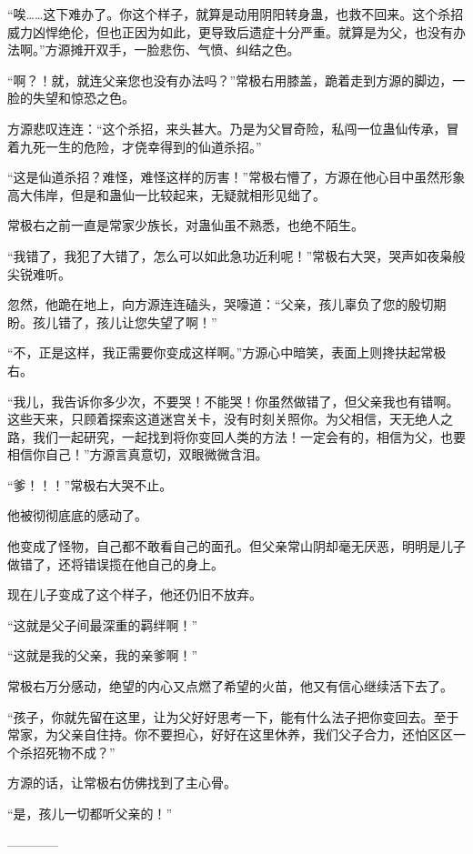 \begin{this_body}
“唉……这下难办了。你这个样子，就算是动用阴阳转身蛊，也救不回来。这个杀招威力凶悍绝伦，但也正因为如此，更导致后遗症十分严重。就算是为父，也没有办法啊。”方源摊开双手，一脸悲伤、气愤、纠结之色。

“啊？！就，就连父亲您也没有办法吗？”常极右用膝盖，跪着走到方源的脚边，一脸的失望和惊恐之色。

方源悲叹连连：“这个杀招，来头甚大。乃是为父冒奇险，私闯一位蛊仙传承，冒着九死一生的危险，才侥幸得到的仙道杀招。”

“这是仙道杀招？难怪，难怪这样的厉害！”常极右懵了，方源在他心目中虽然形象高大伟岸，但是和蛊仙一比较起来，无疑就相形见绌了。

常极右之前一直是常家少族长，对蛊仙虽不熟悉，也绝不陌生。

“我错了，我犯了大错了，怎么可以如此急功近利呢！”常极右大哭，哭声如夜枭般尖锐难听。

忽然，他跪在地上，向方源连连磕头，哭嚎道：“父亲，孩儿辜负了您的殷切期盼。孩儿错了，孩儿让您失望了啊！”

“不，正是这样，我正需要你变成这样啊。”方源心中暗笑，表面上则搀扶起常极右。

“我儿，我告诉你多少次，不要哭！不能哭！你虽然做错了，但父亲我也有错啊。这些天来，只顾着探索这道迷宫关卡，没有时刻关照你。为父相信，天无绝人之路，我们一起研究，一起找到将你变回人类的方法！一定会有的，相信为父，也要相信你自己！”方源言真意切，双眼微微含泪。

“爹！！！”常极右大哭不止。

他被彻彻底底的感动了。

他变成了怪物，自己都不敢看自己的面孔。但父亲常山阴却毫无厌恶，明明是儿子做错了，还将错误揽在他自己的身上。

现在儿子变成了这个样子，他还仍旧不放弃。

“这就是父子间最深重的羁绊啊！”

“这就是我的父亲，我的亲爹啊！”

常极右万分感动，绝望的内心又点燃了希望的火苗，他又有信心继续活下去了。

“孩子，你就先留在这里，让为父好好思考一下，能有什么法子把你变回去。至于常家，为父亲自住持。你不要担心，好好在这里休养，我们父子合力，还怕区区一个杀招死物不成？”

方源的话，让常极右仿佛找到了主心骨。

“是，孩儿一切都听父亲的！”

------------

\end{this_body}

